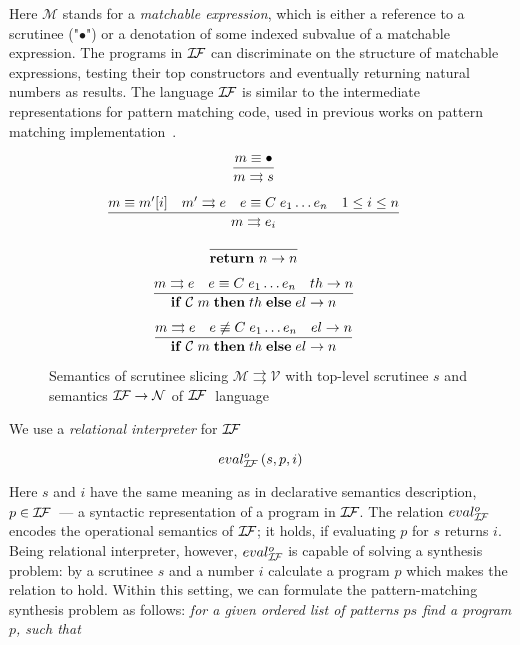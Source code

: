  Here $\mathcal{M}$ stands for a \emph{matchable expression}, which is either a reference to a scrutinee ("$\bullet$") or
 a denotation of some indexed subvalue of a matchable expression. The programs in $\mathcal{I\!F}$ can discriminate on the
 structure of matchable expressions, testing their top constructors and eventually returning natural numbers as results.
 The language $\mathcal{I\!F}$ is similar to the intermediate representations for pattern matching code, used in 
 previous works on pattern matching implementation~\cite{maranget2001,maranget2008}.
 
 
 \begin{figure}
    \[
    \begin{array}{cr}
      \dfrac{m \equiv \bullet} { m \rightrightarrows s} & 
        \\[5mm]
      \dfrac{m \equiv m'[i]\quad m'\rightrightarrows e\quad e\equiv C\;e_1\dots e_n\quad 1\le i\le n} { m \rightrightarrows e_i} & 
        \\[5mm]
      \dfrac{}{\mathbf{return}\ n \rightarrow n} &       
        \\[5mm]
      \dfrac{m \rightrightarrows e \quad e\equiv C\; e_1\dots e_n\quad th \rightarrow n} {\mathbf{if}\;\mathcal{C}\;m \; \mathbf{then}\;th\;\mathbf{else}\;el \rightarrow n} &       
        \\[5mm]
      \dfrac{m \rightrightarrows e \quad e\not\equiv C\; e_1\dots e_n\quad el \rightarrow n} {\mathbf{if}\;\mathcal{C}\;m\;\mathbf{then}\;th\;\mathbf{else}\;el \rightarrow n} &       
    \end{array}
    \]
    \caption{Semantics of scrutinee slicing $\mathcal{M} \rightrightarrows \mathcal{V}$ with top-level scrutinee $s$ and semantics $\mathcal{I\!F}\rightarrow \mathcal{N}$  of $\mathcal{I\!F}\;$ language
    }
   \label{fig:ir}
 \end{figure}
 
 We use a \emph{relational interpreter} for $\mathcal{I\!F}$
 
 \[
 eval^o_{\mathcal{I\!F}}\, (s, p, i)
 \]
 
 Here $s$ and $i$ have the same meaning as in declarative semantics description, $p\in\mathcal{I\!F}$~--- a syntactic representation of
 a program in $\mathcal{I\!F}$. The relation $eval^o_{\mathcal{I\!F}}$ encodes the operational semantics of $\mathcal{I\!F}$; it holds, if
 evaluating $p$ for $s$ returns $i$. Being relational interpreter, however, $eval^o_{\mathcal{I\!F}}$ is capable of solving a
 synthesis problem: by a scrutinee $s$ and a number $i$ calculate a program $p$ which makes the relation to hold.
 Within this setting, we can formulate the pattern-matching synthesis problem as follows: \emph{for a given ordered list of patterns $ps$ find a program $p$, such that}
 
